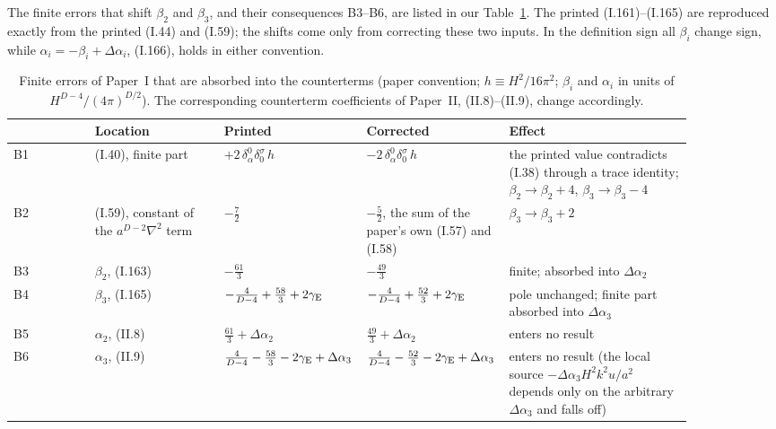 \documentclass[aps,prd,onecolumn,10pt,nofootinbib,floatfix]{revtex4-2}
\newcommand{\eqI}[1]{(I.#1)}
\newcommand{\eqII}[1]{(II.#1)}
\begin{document}
The finite errors that shift $\beta_2$ and $\beta_3$, and their consequences B3--B6, are listed in our
Table~\ref{tab:s0s1s7s8:finite}. The printed \eqI{161}--\eqI{165}
are reproduced exactly from the printed \eqI{44} and \eqI{59}; the shifts come only from correcting these two inputs. In the
definition sign all $\beta_i$ change sign, while $\alpha_i=-\beta_i+\Delta\alpha_i$, \eqI{166}, holds in either convention.

\begin{table}[tb]
\caption{Finite errors of Paper~I that are absorbed into the counterterms (paper convention; $h\equiv H^2/16\pi^2$; $\beta_i$ and
$\alpha_i$ in units of $H^{D-4}/(4\pi)^{D/2}$). The corresponding counterterm coefficients of Paper~II, \eqII{8}--\eqII{9}, change
accordingly.}
\label{tab:s0s1s7s8:finite}
\renewcommand{\arraystretch}{1.3}
\small
\begin{ruledtabular}
\begin{tabular}{@{}l>{\raggedright\arraybackslash}p{0.19\linewidth}>{\raggedright\arraybackslash}p{0.21\linewidth}%
>{\raggedright\arraybackslash}p{0.21\linewidth}>{\raggedright\arraybackslash}p{0.27\linewidth}@{}}
& Location & Printed & Corrected & Effect\\
\hline
B1 & \eqI{40}, finite part & $+2\,\delta^0_\alpha\delta^\sigma_0\,h$ & $-2\,\delta^0_\alpha\delta^\sigma_0\,h$ &
the printed value contradicts \eqI{38} through a trace identity; $\beta_2\to\beta_2+4$, $\beta_3\to\beta_3-4$\\
B2 & \eqI{59}, constant of the $a^{D-2}\nabla^2$ term & $-\tfrac72$ & $-\tfrac52$, the sum of the paper's own \eqI{57} and \eqI{58} &
$\beta_3\to\beta_3+2$\\
B3 & $\beta_2$, \eqI{163} & $-\tfrac{61}{3}$ & $-\tfrac{49}{3}$ & finite; absorbed into $\Delta\alpha_2$\\
B4 & $\beta_3$, \eqI{165} & $-\tfrac{4}{D-4}+\tfrac{58}{3}+2\gamma_{\rm E}$ & $-\tfrac{4}{D-4}+\tfrac{52}{3}+2\gamma_{\rm E}$ &
pole unchanged; finite part absorbed into $\Delta\alpha_3$\\
B5 & $\alpha_2$, \eqII{8} & $\tfrac{61}{3}+\Delta\alpha_2$ & $\tfrac{49}{3}+\Delta\alpha_2$ & enters no result\\
B6 & $\alpha_3$, \eqII{9} & $\tfrac{4}{D-4}-\tfrac{58}{3}-2\gamma_{\rm E}+\Delta\alpha_3$ & $\tfrac{4}{D-4}-\tfrac{52}{3}-2\gamma_{\rm E}+\Delta\alpha_3$ &
enters no result (the local source $-\Delta\alpha_3H^2k^2u/a^2$ depends only on the arbitrary $\Delta\alpha_3$ and falls off)\\
\end{tabular}
\end{ruledtabular}
\end{table}
\end{document}
